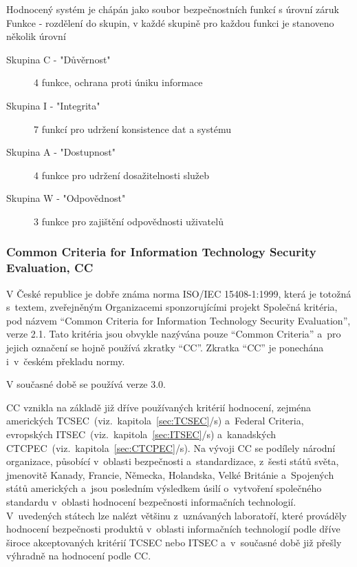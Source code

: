 \documentclass[a4paper,12pt]{article}
\newcommand{\odkazNaKapitolu}[1]{(viz.~kapitola~\ref{#1}/s\pageref{#1})}
\begin{document}
Hodnocený systém je chápán jako soubor bezpečnostních funkcí s úrovní záruk~\cite{PrezentaceBIS}\\

Funkce - rozdělení do skupin, v každé skupině pro každou funkci je stanoveno několik úrovní~\cite{PrezentaceBIS}
\begin{description}
 \item[Skupina C - "Důvěrnost"] 4 funkce, ochrana proti úniku informace 
 \item[Skupina I - "Integrita"] 7 funkcí pro udržení konsistence dat a systému 
 \item[Skupina A - "Dostupnost"] 4 funkce pro udržení dosažitelnosti služeb 
 \item[Skupina W - "Odpovědnost"] 3 funkce pro zajištění odpovědnosti uživatelů 
\end{description}

\subsubsection[Common Criteria, CC]{Common Criteria for Information Technology Security Evaluation, CC}\label{sec:cc}
V České republice je dobře známa norma ISO/IEC 15408-1:1999, která je totožná s~textem, zveřejněným Organizacemi sponzorujícími projekt Společná kritéria, pod názvem “Common Criteria for Information Technology Security Evaluation”, verze 2.1. Tato kritéria jsou obvykle nazývána pouze “Common Criteria” a~pro jejich označení se hojně používá zkratky “CC”. Zkratka “CC”
je ponechána i~v~českém překladu normy.\cite{NBUHodnoceniBezpecnostiSW}

V současné době se používá verze 3.0.

CC vznikla na základě již dříve používaných kritérií hodnocení, zejména amerických TCSEC~\odkazNaKapitolu{sec:TCSEC} a~Federal Criteria, evropských ITSEC~\odkazNaKapitolu{sec:ITSEC} a~kanadských CTCPEC~\odkazNaKapitolu{sec:CTCPEC}. Na vývoji CC se podílely národní organizace, působící v~oblasti bezpečnosti a~standardizace, z~šesti států světa, jmenovitě Kanady, Francie, Německa, Holandska, Velké Británie a~Spojených států amerických a~jsou posledním výsledkem úsilí o~vytvoření společného standardu v~oblasti hodnocení bezpečnosti informačních technologií. V~uvedených státech lze nalézt většinu z~uznávaných laboratoří, které prováděly hodnocení bezpečnosti produktů v~oblasti informačních technologií podle dříve široce akceptovaných kritérií TCSEC nebo ITSEC a~v~současné době již přešly výhradně na hodnocení podle CC.\cite{NBUHodnoceniBezpecnostiSW}
\end{document}
